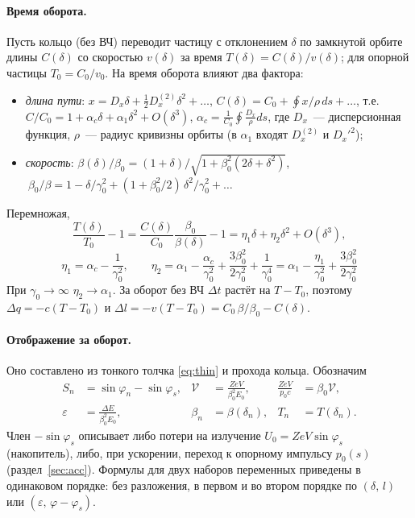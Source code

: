 \documentclass[a4paper,11pt]{article}
\numberwithin{equation}{section}
\begin{document}
\paragraph{Время оборота.} Пусть кольцо (без ВЧ) переводит частицу с отклонением $\delta$ по замкнутой орбите
длины $C(\delta)$ со скоростью $v(\delta)$ за время $T(\delta)=C(\delta)/v(\delta)$; для опорной частицы $T_0=C_0/v_0$.
На время оборота влияют два фактора:
\begin{itemize}
\item \emph{длина пути}: $x=D_x\delta+\tfrac12D_x^{(2)}\delta^2+\dots$, $C(\delta)=C_0+\oint x/\rho\,ds+\dots$, т.е.
$C/C_0=1+\alpha_c\delta+\alpha_1\delta^2+O(\delta^3)$, $\alpha_c=\frac{1}{C_0}\oint\frac{D_x}{\rho}ds$,
где $D_x$~--- дисперсионная функция, $\rho$~--- радиус кривизны орбиты (в $\alpha_1$ входят $D_x^{(2)}$ и $D_x'^2$);
\item \emph{скорость}: $\beta(\delta)/\beta_0=(1+\delta)\big/\sqrt{1+\beta_0^2(2\delta+\delta^2)}$,
$\ \beta_0/\beta=1-\delta/\gamma_0^2+(1+\beta_0^2/2)\,\delta^2/\gamma_0^2+\dots$
\end{itemize}
Перемножая,
\begin{equation}
\frac{T(\delta)}{T_0}-1=\frac{C(\delta)}{C_0}\frac{\beta_0}{\beta(\delta)}-1=\eta_1\delta+\eta_2\delta^2+O(\delta^3),
\end{equation}
\begin{equation}
\boxed{\ \eta_1=\alpha_c-\frac{1}{\gamma_0^2},\qquad
\eta_2=\alpha_1-\frac{\alpha_c}{\gamma_0^2}+\frac{3\beta_0^2}{2\gamma_0^2}+\frac{1}{\gamma_0^4}
=\alpha_1-\frac{\eta_1}{\gamma_0^2}+\frac{3\beta_0^2}{2\gamma_0^2}\ } \label{eq:eta2}
\end{equation}
При $\gamma_0\to\infty$ $\eta_2\to\alpha_1$. За оборот без ВЧ $\Delta t$ растёт на $T-T_0$,
поэтому $\Delta q=-c(T-T_0)$ и $\Delta l=-v(T-T_0)=C_0\,\beta/\beta_0-C(\delta)$.

\paragraph{Отображение за оборот.} Оно составлено из тонкого толчка \eqref{eq:thin} и прохода кольца. Обозначим
\[
\begin{aligned}
S_n&=\sin\varphi_n-\sin\varphi_s, & \mathcal V&=\frac{ZeV}{\beta_0^2E_0}, & \frac{ZeV}{p_0c}&=\beta_0\mathcal V,\\
\varepsilon&=\frac{\Delta E}{\beta_0^2E_0}, & \beta_n&=\beta(\delta_n), & T_n&=T(\delta_n).
\end{aligned}
\]
Член $-\sin\varphi_s$ описывает либо потери на излучение $U_0=ZeV\sin\varphi_s$ (накопитель), либо, при ускорении,
переход к опорному импульсу $p_0(s)$ (раздел~\ref{sec:acc}). Формулы для двух наборов переменных
приведены в одинаковом порядке: без разложения, в первом и во втором порядке по $(\delta,\,l)$ или $(\varepsilon,\,\varphi-\varphi_s)$.
\end{document}
